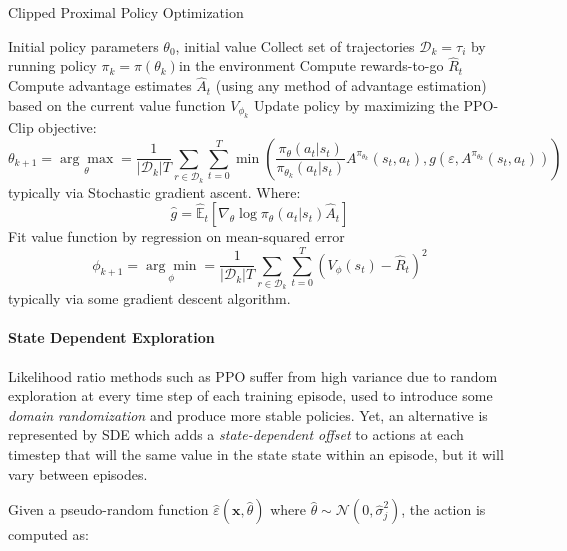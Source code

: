 \begin{algorithm}[H]
    \caption{Clipped Proximal Policy Optimization}
    \label{alg:ppo}
    \begin{algorithmic}[1]
        \Require Initial policy parameters $\theta _0$, initial value
        \State Collect set of trajectories $\mathcal{D} _k = \tau _i$ by running policy $\pi _k = \pi(\theta _k)$in the environment
        \State Compute rewards-to-go $\hat{R} _t$
        \State Compute advantage estimates $\hat{A} _t$
        (using any method of advantage estimation) based on the current value function $V _{\phi _k}$
        \State Update policy by maximizing the PPO-Clip objective:
        $$
            \theta _{k + 1} = \underset{\theta}{\arg\max} = \frac{1}{|\mathcal{D} _k|T} \sum _{r \in \mathcal{D} _k} \sum _{t = 0} ^{T} \min \left( \frac{\pi _{\theta} (a _t | s _t)}{\pi _{\theta_k} (a _t | s _t)} A ^{\pi _{\theta_k}} (s _t, a _t), g(\varepsilon, A ^{\pi _{\theta_k}}(s _t, a _t)) \right)
        $$
        typically via Stochastic gradient ascent. Where:
        $$
            \hat{g} = \hat{\mathbb{E}} _t \left[\nabla _{\theta}\log\pi _{\theta}(a _t | s _t) \hat{A} _t\right]
        $$
        \State Fit value function by regression on mean-squared error
        $$
            \phi _{k + 1} = \underset{\phi}{\arg\min} = \frac{1}{|\mathcal{D} _k|T} \sum _{r \in \mathcal{D} _k} \sum _{t = 0} ^{T} \left(V _{\phi}(s _t) - \hat{R} _t \right)^2
        $$
        typically via some gradient descent algorithm.
        \EndFor
    \end{algorithmic}
\end{algorithm}


\paragraph{State Dependent Exploration} Likelihood ratio methods such as \ac{PPO} suffer from high variance due to random exploration at every time step of each training episode, used to introduce some \textit{domain randomization} and produce more stable policies. Yet, an alternative is represented by \ac{SDE} \citep{daelemans_state-dependent_2008, raffin_smooth_2021} which adds a \textit{state-dependent offset} to actions at each timestep that will the same value in the state state within an episode, but it will vary between episodes.

Given a pseudo-random function $\hat{\varepsilon}(\mathbf{x}, \hat{\theta})$ where $\hat{\theta} \sim \mathcal{N}(0, \hat{\sigma} _j ^2)$, the action is computed as:


